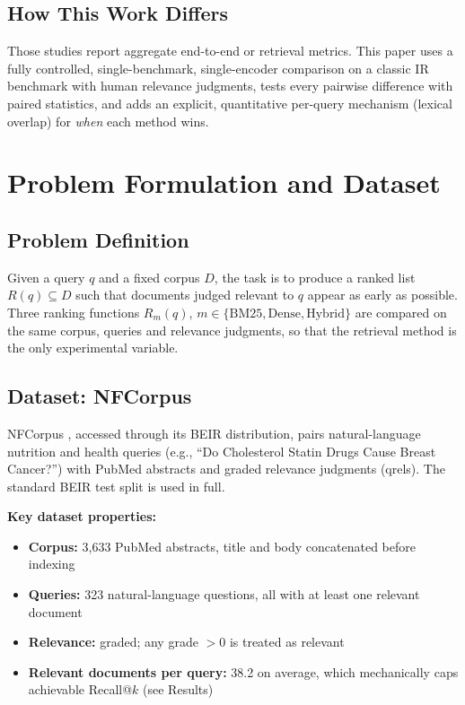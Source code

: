 \documentclass[10pt,letterpaper,twocolumn]{article}
\begin{document}
\subsection{How This Work Differs}
Those studies report aggregate end-to-end or retrieval metrics. This paper uses a fully controlled, single-benchmark, single-encoder comparison on a classic IR benchmark with human relevance judgments, tests every pairwise difference with paired statistics, and adds an explicit, quantitative per-query mechanism (lexical overlap) for \emph{when} each method wins.

\section{Problem Formulation and Dataset}
\subsection{Problem Definition}
Given a query $q$ and a fixed corpus $D$, the task is to produce a ranked list $R(q)\subseteq D$ such that documents judged relevant to $q$ appear as early as possible. Three ranking functions $R_m(q)$, $m\in\{\text{BM25},\text{Dense},\text{Hybrid}\}$ are compared on the same corpus, queries and relevance judgments, so that the retrieval method is the only experimental variable.

\subsection{Dataset: NFCorpus}
NFCorpus \citep{boteva2016}, accessed through its BEIR distribution, pairs natural-language nutrition and health queries (e.g., ``Do Cholesterol Statin Drugs Cause Breast Cancer?'') with PubMed abstracts and graded relevance judgments (qrels). The standard BEIR test split is used in full.

\textbf{Key dataset properties:}
\begin{itemize}
\item \textbf{Corpus:} 3,633 PubMed abstracts, title and body concatenated before indexing
\item \textbf{Queries:} 323 natural-language questions, all with at least one relevant document
\item \textbf{Relevance:} graded; any grade $>0$ is treated as relevant
\item \textbf{Relevant documents per query:} 38.2 on average, which mechanically caps achievable Recall@$k$ (see Results)
\end{itemize}
\end{document}

